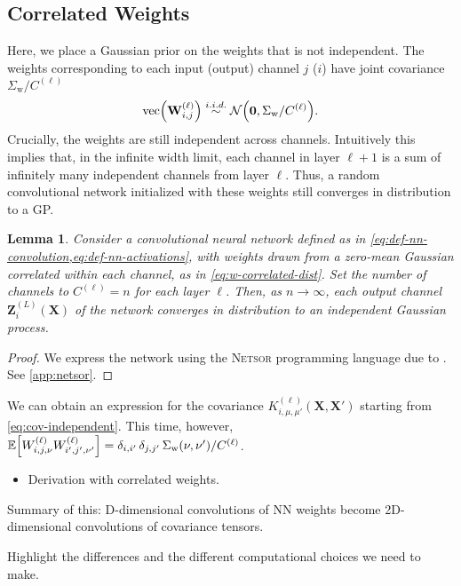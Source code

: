 \documentclass{article}
\newtheorem{lemma}[theorem]{Lemma}
\theoremstyle{definition}
\newcommand{\vX}{\mathbf{X}}
\newcommand{\vW}{\mathbf{W}}
\newcommand{\vZ}{\mathbf{Z}}
\newcommand{\vecfun}{\text{vec}\bra}
\newcommand{\simiid}{\overset{i.i.d.}{\sim}}
\newcommand{\bracket}[3]{{\left#1 #3 \right#2}}
\newcommand{\bra}{\bracket{(}{)}}
\newcommand{\sqb}{\bracket{[}{]}}
\newcommand{\ssup}[1]{^{\bra{#1}}}
\begin{document}
\subsection{Correlated Weights}
Here, we place a Gaussian prior on the weights that is not independent. The weights
corresponding to each input (output) channel $j$ ($i$) have joint covariance
$\Sigma_\text{w}/C\ssup{\ell}$
\begin{equation}
  \vecfun{\vW\ssup{\ell}_{i,j}} \simiid \NormDist{\boldsymbol{0}, \Sigma_\text{w}/C\ssup{\ell}}.
  \label{eq:w-correlated-dist}
\end{equation}
Crucially, the weights are still independent across channels. Intuitively this
implies that, in the infinite width limit, each channel in layer $\ell+1$ is a
sum of infinitely many independent channels from layer $\ell$. Thus, a random
convolutional network initialized with these weights still converges in distribution
to a GP.

\begin{lemma}
  Consider a convolutional neural network defined as in
  \cref{eq:def-nn-convolution,eq:def-nn-activations}, with weights drawn from a
  zero-mean Gaussian correlated within each channel, as in \cref{eq:w-correlated-dist}.
  Set the number of channels to $C\ssup{\ell} = n$ for each layer $\ell$. Then,
  as $n\to \infty$, each output channel $\vZ\ssup{L}_i(\vX)$ of the network converges in
  distribution to an independent Gaussian process.
\end{lemma}
\begin{proof}
  We express the network using the \textsc{Netsor} programming language due to
  \citet{yang2019wide}. See \cref{app:netsor}.
\end{proof}

We can obtain an expression for the covariance $K\ssup{\ell}_{i,\mu,\mu'}(\vX,
\vX')$ starting from \cref{eq:cov-independent}. This time, however,
$\ExpSymb\sqb{W\ssup{\ell}_{i,j,\nu}W\ssup{\ell}_{i',j',\nu'}} = \delta_{i,i'} \, \delta_{j, j'} \, \Sigma_{\text{w}}\bra{\nu,\nu'}/C\ssup{\ell}$.

  
\begin{itemize}
    \item Derivation with correlated weights.
\end{itemize}
Summary of this: D-dimensional convolutions of NN weights become 2D-dimensional convolutions of covariance tensors. 

Highlight the differences and the different computational choices we need to make.
\end{document}
